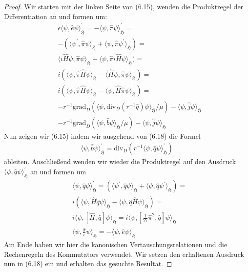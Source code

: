 \documentclass[11pt,a4paper,leqno]{report}
\numberwithin{equation}{chapter}
\begin{document}
\begin{proof}
Wir starten mit der linken Seite von (6.15), wenden die Produktregel der Differentiation an und formen um:
\begin{align*}
	&\epsilon\langle \psi, \hat{e}\psi\rangle_{\mathfrak{H}}^\prime = -\langle \psi, \hat{\pi}\psi\rangle_{\mathfrak{H}}^\prime=\\
	&-(\langle \psi^\prime, \hat{\pi}\psi\rangle_{\mathfrak{H}}+\langle \psi, \hat{\pi}\psi^\prime\rangle_{\mathfrak{H}})=\\
	&\langle i\hat{H}\psi, \hat{\pi}\psi\rangle_{\mathfrak{H}}+\langle \psi, \hat{\pi}i\hat{H}\psi\rangle_{\mathfrak{H}})=\\
	&i(\langle \psi, \hat{\pi}\hat{H}\psi\rangle_{\mathfrak{H}} - \langle \hat{H}\psi, \hat{\pi}\psi\rangle_{\mathfrak{H}})=\\
	&i(\langle \psi, \hat{\pi}\hat{H}\psi\rangle_{\mathfrak{H}} - \langle \psi, \hat{H}\hat{\pi}\psi\rangle_{\mathfrak{H}})=\\
	&-r^{-1} \text{grad}_D(\langle\psi,\text{div}_D(r^{-1}\hat{q})\psi\rangle_{\mathfrak{H}}/\mu) -  \langle \psi, \hat{j} \psi\rangle_{\mathfrak{H}}\\
	&-r^{-1} \text{grad}_D(\langle\psi,\hat{b}\psi\rangle_{\mathfrak{H}}/\mu) -  \langle \psi, \hat{j} \psi\rangle_{\mathfrak{H}}
\end{align*}
Nun zeigen wir (6.15) indem wir ausgehend von (6.18) die Formel
	\begin{align}
\langle \psi, \hat{b}\psi\rangle_{\mathfrak{H}}^\prime = \text{div}_D(r^{-1}\langle \psi, \hat{q}\psi\rangle_{\mathfrak{H}}^\prime)
\end{align}
ableiten. Anschließend wenden wir wieder die Produktregel auf den Ausdruck $\langle \psi, \hat{q}\psi\rangle_{\mathfrak{H}}^\prime$ an und formen um
	\begin{align*}
	&\langle \psi, \hat{q}\psi\rangle_{\mathfrak{H}}^\prime= (\langle \psi^\prime, \hat{q}\psi\rangle_{\mathfrak{H}}+\langle \psi, \hat{q}\psi^\prime\rangle_{\mathfrak{H}})=\\
	&i(\langle \psi, \hat{H}\hat{q}\psi\rangle_{\mathfrak{H}} - \langle \psi, \hat{q}\hat{H}\psi\rangle_{\mathfrak{H}})=\\
	&i\langle \psi, [\hat{H},\hat{q}]\psi\rangle_{\mathfrak{H}}=i\langle \psi, [\frac{1}{2\epsilon}\hat{\pi}^2,\hat{q}]\psi\rangle_{\mathfrak{H}}\\
	&\langle \psi, \frac{\hat{\pi}}{\epsilon}\psi\rangle_{\mathfrak{H}}=-\langle \psi, \hat{e}\psi\rangle_{\mathfrak{H}}
\end{align*}		
Am Ende haben wir hier die kanonischen Vertauschungsrelationen und die Rechenregeln des Kommutators verwendet.
Wir setzen den erhaltenen Ausdruck nun in (6.18) ein und erhalten das gesuchte Resultat.
\end{proof}
\end{document}
